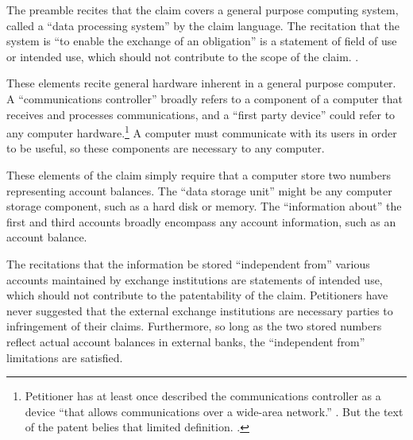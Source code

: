 \documentclass{scotus}
\begin{document}

The preamble recites that the claim covers a general purpose computing system,
called a ``data processing system'' by the claim language. The recitation that
the system is ``to enable the exchange of an obligation'' is a statement of
field of use or intended use, which should not contribute to the scope of the
claim.
.


These elements recite general hardware inherent in a general purpose computer. A
``communications controller'' broadly refers to a component of a computer that
receives and processes communications, and a ``first party device'' could refer
to any computer hardware.\footnote{Petitioner has at least once
described the communications controller as a device ``that allows communications
over a wide-area network.'' . But the text of the
patent belies that limited definition. .} A computer must communicate with its users in order to be useful,
so these components are necessary to any computer.


These elements of the claim simply require that a computer store two numbers
representing account balances. The ``data storage unit'' might be any computer
storage component, such as a hard disk or memory. The ``information about'' the
first and third accounts broadly encompass any account information, such as an
account balance.

The recitations that the information be stored ``independent from'' various
accounts maintained by exchange institutions are statements of intended
use, which should not contribute to the patentability of the claim. Petitioners
have never suggested that the external exchange institutions are necessary
parties to infringement of their claims. Furthermore, so long as the two stored
numbers reflect actual account balances in external banks, the ``independent
from'' limitations are satisfied.
\end{document}
